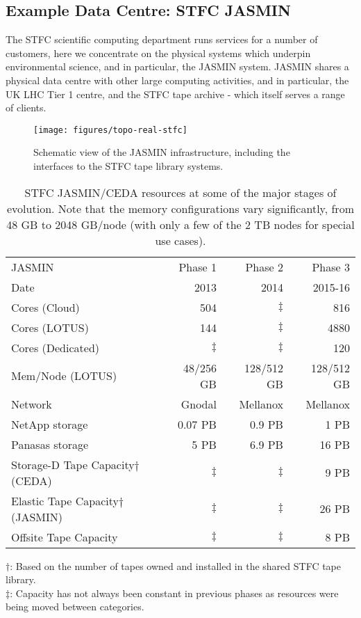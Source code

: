

\subsection{Example Data Centre: STFC JASMIN}
\label{sec:STFC current}

The STFC scientific computing department runs services for a number of customers, here we concentrate on the physical systems which underpin environmental science, and in particular, the JASMIN system.  JASMIN shares a physical data centre with other large computing activities, and in particular, the UK LHC Tier 1 centre, and the STFC tape archive - which itself serves a range of clients.

\begin{figure} [p]
	\centering
	\texttt{[image: figures/topo-real-stfc]}
	\caption{Schematic view of the JASMIN infrastructure, including the interfaces to the STFC tape library systems.}
	\label{fig:topostfc}
\end{figure}


\begin{table} [p]
  \centering
  \begin{tabular}{|l|r|r|r|}
    \hline
    JASMIN		&	Phase 1		& Phase 2	& Phase 3	\\
    Date		&	2013		& 2014		& 2015-16	\\
    \hline
    Cores (Cloud)	&	504		& $\ddagger$		& 816		\\
    Cores (LOTUS)	&	144		& $\ddagger$		& 4880		\\
    Cores (Dedicated) &     $\ddagger$ & $\ddagger $ & 120 \\
    Mem/Node (LOTUS)	&	48/256 GB	& 128/512 GB	& 128/512 GB	\\
    Network		&	Gnodal		& Mellanox	& Mellanox	\\
    NetApp storage	&	0.07 PB		& 0.9 PB	& 1 PB		\\
    Panasas storage	&	5 PB		& 6.9 PB	& 16 PB		\\
    Storage-D Tape Capacity$\dagger$ (CEDA)&	 $\ddagger$	& $\ddagger$	& 9 PB	\\
    Elastic Tape Capacity$\dagger$ (JASMIN)& $\ddagger$&  $\ddagger$	& 26 PB	\\
    Offsite Tape Capacity                                 &         $\ddagger$          &   $\ddagger$    & 8 PB \\
    \hline
     \end{tabular}
     \begin{center}
  $\dagger$: Based on the number of tapes owned and installed in the shared STFC tape library.\\
    $\ddagger$: Capacity has not always been constant in previous phases as resources were being moved between categories.  \end{center}
  \caption{STFC JASMIN/CEDA resources at some of the major stages of evolution. Note that the
  memory configurations vary significantly, from 48 GB to 2048 GB/node (with only a few of the  2 TB nodes for special use cases). \\
}
  \label{table:stfc}
\end{table}


